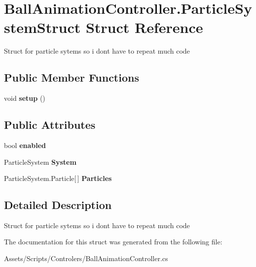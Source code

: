 \hypertarget{struct_ball_animation_controller_1_1_particle_system_struct}{}\section{Ball\+Animation\+Controller.\+Particle\+System\+Struct Struct Reference}
\label{struct_ball_animation_controller_1_1_particle_system_struct}


Struct for particle sytems so i don\textquotesingle{}t have to repeat much code  


\subsection*{Public Member Functions}
\begin{DoxyCompactItemize}
\item 
void {\bfseries setup} ()\hypertarget{struct_ball_animation_controller_1_1_particle_system_struct_a176f63ff00ec2d9669eb8b4f11dbc4b6}{}\label{struct_ball_animation_controller_1_1_particle_system_struct_a176f63ff00ec2d9669eb8b4f11dbc4b6}

\end{DoxyCompactItemize}
\subsection*{Public Attributes}
\begin{DoxyCompactItemize}
\item 
bool {\bfseries enabled}\hypertarget{struct_ball_animation_controller_1_1_particle_system_struct_abd3a8ee0586752bb935b16d251ec2bee}{}\label{struct_ball_animation_controller_1_1_particle_system_struct_abd3a8ee0586752bb935b16d251ec2bee}

\item 
Particle\+System {\bfseries System}\hypertarget{struct_ball_animation_controller_1_1_particle_system_struct_a5217c7c96564918afd34d8d01183a9fa}{}\label{struct_ball_animation_controller_1_1_particle_system_struct_a5217c7c96564918afd34d8d01183a9fa}

\item 
Particle\+System.\+Particle\mbox{[}$\,$\mbox{]} {\bfseries Particles}\hypertarget{struct_ball_animation_controller_1_1_particle_system_struct_a294f988f2273cb95ae2ea200cfb8b2ed}{}\label{struct_ball_animation_controller_1_1_particle_system_struct_a294f988f2273cb95ae2ea200cfb8b2ed}

\end{DoxyCompactItemize}


\subsection{Detailed Description}
Struct for particle sytems so i don\textquotesingle{}t have to repeat much code 



The documentation for this struct was generated from the following file\+:\begin{DoxyCompactItemize}
\item 
Assets/\+Scripts/\+Controlers/Ball\+Animation\+Controller.\+cs\end{DoxyCompactItemize}
